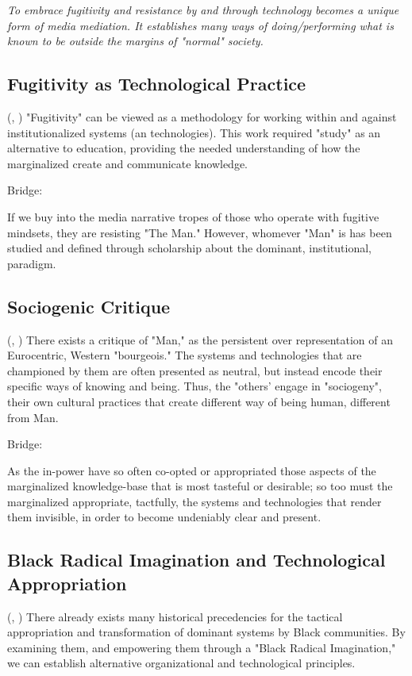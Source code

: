 \textit{To embrace fugitivity and resistance by and through technology becomes a unique form of media mediation. It establishes many ways of doing/performing what is known to be outside the margins of "normal" society.}

\subsection{Fugitivity as Technological Practice}(\parencite{Harney_Moten_2013}, \parencite{Moten_2003})
"Fugitivity" can be viewed as a methodology for working within and against institutionalized systems (an technologies). This work required "study" as an alternative to education, providing the needed understanding of how the marginalized create and communicate knowledge.

Bridge:

 If we buy into the media narrative tropes of those who operate with fugitive mindsets, they are resisting "The Man." However, whomever "Man" is has been studied and defined through scholarship about the dominant, institutional, paradigm.
 
\subsection{Sociogenic Critique}(\parencite{wynter2003}, \parencite{Wynter_2005})
There exists a critique of "Man," as the persistent over representation of an Eurocentric, Western "bourgeois." The systems and technologies that are championed by them are often presented as neutral, but instead encode their specific ways of knowing and being. Thus, the "others' engage in "sociogeny", their own cultural practices that create different way of being human, different from Man.

Bridge:

As the in-power have so often co-opted or appropriated those aspects of the marginalized knowledge-base that is most tasteful or desirable; so too must the marginalized appropriate, tactfully, the systems and technologies that render them invisible, in order to become undeniably clear and present.

\subsection{Black Radical Imagination and Technological Appropriation}(\parencite{Robinson_2020}, \parencite{Kelley_Monet_2003})
There already exists many historical precedencies for the tactical appropriation and transformation of dominant systems by Black communities. By examining them, and empowering them through a "Black Radical Imagination," we can establish alternative organizational and technological principles.

